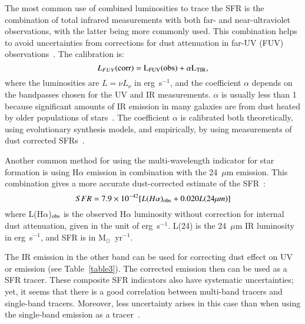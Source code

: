 The most common use of combined luminosities to trace the SFR is the combination of total infrared measurements with both far- and near-ultraviolet observations, with the latter being more commonly used. 
This combination helps to avoid uncertainties from corrections for dust attenuation in far-UV (FUV) observations~\citep[e.g.][]{Hao11}. The calibration is:
\begin{equation}
L_{FUV}(\rm corr) = L_{FUV}(\rm obs) + \alpha L_{\rm TIR},
\end{equation}
where the luminosities are $L = \nu L_{\nu}$ in erg~s$^{-1}$, and the coefficient $\alpha$ depends on the bandpasses chosen for the UV and IR measurements. $\alpha$ is usually less than 1 because significant amounts of IR emission in many galaxies are from dust heated by older populations of stars~\citep{Kennicutt12}. The coefficient $\alpha$ is calibrated both theoretically, using evolutionary synthesis models, and empirically, by using measurements of dust corrected SFRs~\citep[e.g.][]{Hao11, Leroy08}. 

Another common method for using the multi-wavelength indicator for star formation is using H${\alpha}$ emission in combination with the 24~$\mu$m emission. 
This combination gives a more accurate dust-corrected estimate of the SFR~\citep{Kennicutt09}:
\begin{equation} 
\label{equ: halphaplus24}
SFR = 7.9 \times 10^{-42}[L(H{\alpha})_{\rm obs} + 0.020L(24 \mu m)]
\end{equation}
where L(H${\alpha}$)$_{\rm obs}$ is the observed H${\alpha}$ luminosity without correction for internal dust attenuation, given in the unit of erg~s$^{-1}$. 
L(24) is the 24~$\mu$m IR luminosity in erg~s$^{-1}$, and SFR is in M$_{\odot}$~yr$^{-1}$.


The IR emission in the other band can be used for correcting dust effect on UV or \halpha emission (see Table~\ref{table3}). 
The corrected emission then can be used as a SFR tracer.
These composite SFR indicators also have systematic uncertainties; yet, it seems that there is a good correlation between multi-band tracers and single-band tracers. 
Moreover, less uncertainty arises in this case than when using the single-band emission as a tracer~\citep{Kennicutt09}. 


